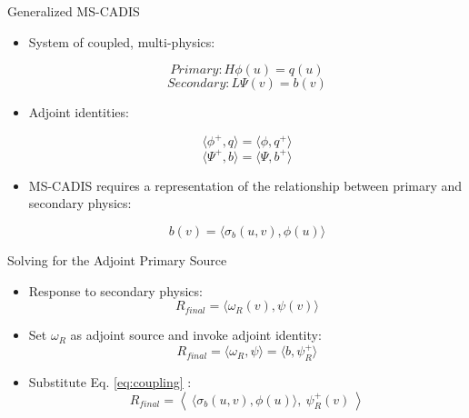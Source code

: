 \documentclass{beamer}
\begin{document}
\begin{frame}{Generalized MS-CADIS}
\begin{itemize}
  \item{System of coupled, multi-physics:}

	\begin{center}
          \begin{equation}
          	Primary:	H\phi(u) = q(u)
          \end{equation}
		\vspace{-0.4cm}          
          \begin{equation}
          	Secondary:	L\Psi(v) = b(v)
          \end{equation}
	\end{center}

  \item{Adjoint identities:}
	\begin{center}
          \begin{equation}
          	\langle \phi^{+}, q \rangle =
          	\langle \phi, q^{+} \rangle 
          \end{equation}
		\vspace{-0.4cm}          
          \begin{equation}
          	\langle \Psi^{+}, b \rangle =
          	\langle \Psi, b^{+} \rangle 
          \end{equation}
	\end{center}
  \item{MS-CADIS requires a representation of the relationship between primary
	  and secondary physics:}
	\begin{center}
          \begin{equation}\label{eq:coupling}
            b(v) = \langle \sigma_b(u,v), \phi(u) \rangle
          \end{equation}
        \end{center}
\end{itemize}
\end{frame}

\begin{frame}{Solving for the Adjoint Primary Source}
\begin{itemize}
\item{Response to secondary physics:}
\begin{equation} \label{eq:response}
  R_{final} = \langle \omega_R(v), \psi(v) \rangle
\end{equation}
\item{Set $\omega_R$ as adjoint source and invoke adjoint identity:}
\begin{equation}
  R_{final} = \langle \omega_R, \psi \rangle = \langle b, \psi_R^{+}\rangle
\end{equation}
\item{Substitute Eq. \ref{eq:coupling} :}
\begin{equation}
  R_{final} = \left \langle\  \langle \sigma_b(u,v) , \phi(u) \rangle,\
	\psi_R^{+}(v) \ \right\rangle
\end{equation}

\end{itemize}
\end{frame}
\end{document}
